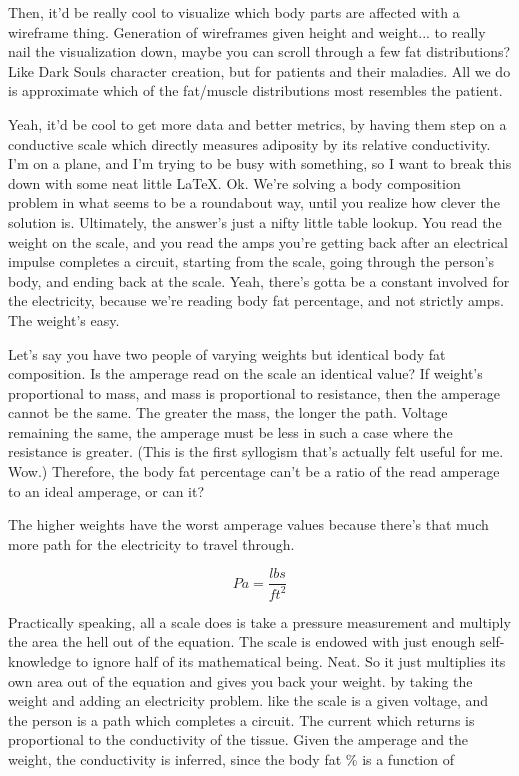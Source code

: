 \documentclass{article}
\begin{document}
Then, it'd be really cool to visualize which body parts are affected with a wireframe thing. Generation of wireframes given height and weight... to really nail the visualization down, maybe you can scroll through a few fat distributions? Like Dark Souls character creation, but for patients and their maladies. All we do is approximate which of the fat/muscle distributions most resembles the patient.

Yeah, it'd be cool to get more data and better metrics, by having them step on a conductive scale which directly measures adiposity by its relative conductivity. I'm on a plane, and I'm trying to be busy with something, so I want to break this down with some neat little \LaTeX.
Ok. We're solving a body composition problem in what seems to be a roundabout way, until you realize how clever the solution is. Ultimately, the answer's just a nifty little table lookup. You read the weight on the scale, and you read the amps you're getting back after an electrical impulse completes a circuit, starting from the scale, going through the person's body, and ending back at the scale. Yeah, there's gotta be a constant involved for the electricity, because we're reading body fat percentage, and not strictly amps. The weight's easy.

Let's say you have two people of varying weights but identical body fat composition. Is the amperage read on the scale an identical value?
If weight's proportional to mass, and mass is proportional to resistance, then the amperage cannot be the same. The greater the mass, the longer the path. Voltage remaining the same, the amperage must be less in such a case where the resistance is greater. (This is the first syllogism that's actually felt useful for me. Wow.) Therefore, the body fat percentage can't be a ratio of the read amperage to an ideal amperage, or can it?

The higher weights have the worst amperage values because there's that much more path for the electricity to travel through.

\begin{displaymath}
	Pa = \frac{lbs}{ft^2}
\end{displaymath}

Practically speaking, all a scale does is take a pressure measurement and multiply the area the hell out of the equation. The scale is endowed with just enough self-knowledge to ignore half of its mathematical being. Neat. So it just multiplies its own area out of the equation and gives you back your weight. by taking the weight and adding an electricity problem. like the scale is a given voltage, and the person is a path which completes a circuit. The current which returns is proportional to the conductivity of the tissue. Given the amperage and the weight, the conductivity is inferred, since the body fat \% is a function of 
\end{document}
